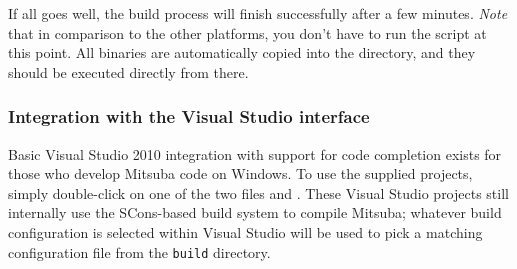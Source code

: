 If all goes well, the build process will finish successfully after a few
minutes. \emph{Note} that in comparison to the other platforms, you don't have to run the  script at this point. 
All binaries are automatically copied into the  directory, and they should be executed directly from there.

\subsubsection{Integration with the Visual Studio interface}
Basic Visual Studio 2010 integration with support for code completion 
exists for those who develop Mitsuba code on Windows. 
To use the supplied projects, simply double-click on one of the two files  
and . These Visual Studio projects still internally
use the SCons-based build system to compile Mitsuba; whatever 
build configuration is selected within Visual Studio will be used to pick a matching
configuration file from the \texttt{build} directory. 

